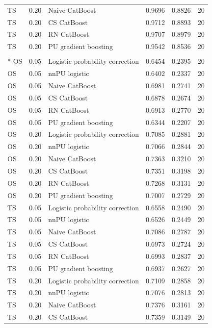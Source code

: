 \begin{longtable}{@{}p{0.65in}rp{2.85in}rrr@{}}
TS & 0.20 & Naive CatBoost & 0.9696 & 0.8826 & 20 \\
TS & 0.20 & CS CatBoost & 0.9712 & 0.8893 & 20 \\
TS & 0.20 & RN CatBoost & 0.9707 & 0.8979 & 20 \\
TS & 0.20 & PU gradient boosting & 0.9542 & 0.8536 & 20 \\
\addlinespace[2pt]
\multicolumn{6}{l}{\textbf{Online Shoppers}}\\*
OS & 0.05 & Logistic probability correction & 0.6454 & 0.2395 & 20 \\
OS & 0.05 & nnPU logistic & 0.6402 & 0.2337 & 20 \\
OS & 0.05 & Naive CatBoost & 0.6981 & 0.2741 & 20 \\
OS & 0.05 & CS CatBoost & 0.6878 & 0.2674 & 20 \\
OS & 0.05 & RN CatBoost & 0.6913 & 0.2770 & 20 \\
OS & 0.05 & PU gradient boosting & 0.6344 & 0.2207 & 20 \\
\addlinespace[2pt]
OS & 0.20 & Logistic probability correction & 0.7085 & 0.2881 & 20 \\
OS & 0.20 & nnPU logistic & 0.7066 & 0.2844 & 20 \\
OS & 0.20 & Naive CatBoost & 0.7363 & 0.3210 & 20 \\
OS & 0.20 & CS CatBoost & 0.7351 & 0.3198 & 20 \\
OS & 0.20 & RN CatBoost & 0.7268 & 0.3131 & 20 \\
OS & 0.20 & PU gradient boosting & 0.7007 & 0.2729 & 20 \\
\addlinespace[2pt]
TS & 0.05 & Logistic probability correction & 0.6558 & 0.2490 & 20 \\
TS & 0.05 & nnPU logistic & 0.6526 & 0.2449 & 20 \\
TS & 0.05 & Naive CatBoost & 0.7086 & 0.2787 & 20 \\
TS & 0.05 & CS CatBoost & 0.6973 & 0.2724 & 20 \\
TS & 0.05 & RN CatBoost & 0.6993 & 0.2837 & 20 \\
TS & 0.05 & PU gradient boosting & 0.6937 & 0.2627 & 20 \\
\addlinespace[2pt]
TS & 0.20 & Logistic probability correction & 0.7109 & 0.2858 & 20 \\
TS & 0.20 & nnPU logistic & 0.7076 & 0.2813 & 20 \\
TS & 0.20 & Naive CatBoost & 0.7376 & 0.3161 & 20 \\
TS & 0.20 & CS CatBoost & 0.7359 & 0.3149 & 20 \\

\end{longtable}
